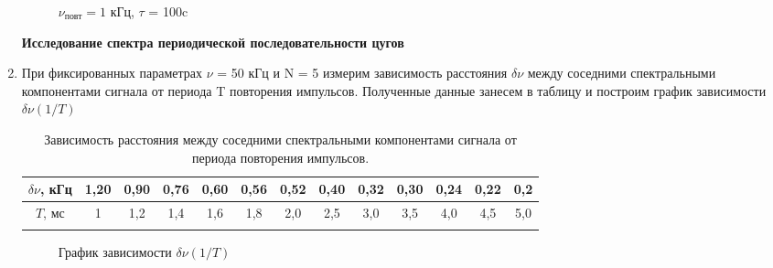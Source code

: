 \documentclass[a4paper, 12pt]{article}%
\begin{document}
\begin{enumerate}
\begin{figure}[H]
	\caption{$\nu_{\text{повт}} = 1$ кГц, $\tau$ = 100c}
\end{figure}

	
\newpage
	
\textbf{Исследование спектра периодической последовательности цугов}

\item При фиксированных параметрах $\nu$ = 50 кГц и N = 5 измерим зависимость расстояния $\delta\nu$ между соседними спектральными компонентами сигнала от периода T повторения импульсов. Полученные данные занесем в таблицу и построим график зависимости $\delta\nu(1/T)$
	
\begin{longtable} {|c|c|c|c|c|c|c|c|c|c|c|c|c|}
	\hline
	$\delta\nu$, кГц& 1,20 & 0,90 & 0,76 & 0,60 & 0,56 & 0,52 & 0,40 & 0,32 & 0,30 & 0,24 & 0,22 & 0,2 \\ \hline
	$T$, мс & 1 & 1,2 & 1,4 & 1,6 & 1,8 & 2,0 & 2,5 & 3,0 & 3,5 & 4,0 & 4,5 & 5,0 \\ \hline
	\caption{Зависимость расстояния между соседними
		спектральными компонентами сигнала от периода повторения импульсов.}
\end{longtable}
	
\begin{figure}[H]
	\caption{График зависимости $\delta\nu(1/T)$}
\end{figure}
	

\end{enumerate}
\end{document}
